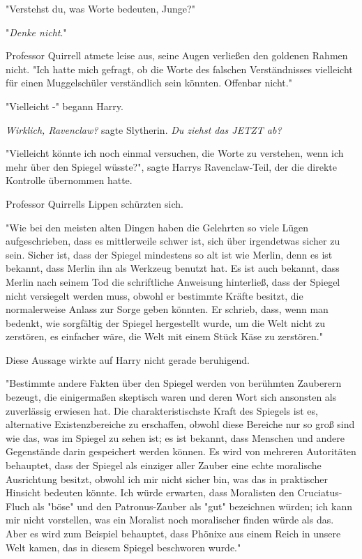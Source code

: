 {"Verstehst du, was Worte bedeuten, Junge?"

"\emph{Denke nicht}."

Professor Quirrell atmete leise aus, seine Augen verließen den goldenen Rahmen nicht. "Ich hatte mich gefragt, ob die Worte des falschen Verständnisses vielleicht für einen Muggelschüler verständlich sein könnten. Offenbar nicht."

"Vielleicht -" begann Harry.

\emph{Wirklich, Ravenclaw?} sagte Slytherin. \emph{Du ziehst das JETZT ab?}

"Vielleicht könnte ich noch einmal versuchen, die Worte zu verstehen, wenn ich mehr über den Spiegel wüsste?", sagte Harrys Ravenclaw-Teil, der die direkte Kontrolle übernommen hatte.

Professor Quirrells Lippen schürzten sich.

"Wie bei den meisten alten Dingen haben die Gelehrten so viele Lügen aufgeschrieben, dass es mittlerweile schwer ist, sich über irgendetwas sicher zu sein. Sicher ist, dass der Spiegel mindestens so alt ist wie Merlin, denn es ist bekannt, dass Merlin ihn als Werkzeug benutzt hat. Es ist auch bekannt, dass Merlin nach seinem Tod die schriftliche Anweisung hinterließ, dass der Spiegel nicht versiegelt werden muss, obwohl er bestimmte Kräfte besitzt, die normalerweise Anlass zur Sorge geben könnten. Er schrieb, dass, wenn man bedenkt, wie sorgfältig der Spiegel hergestellt wurde, um die Welt nicht zu zerstören, es einfacher wäre, die Welt mit einem Stück Käse zu zerstören."

Diese Aussage wirkte auf Harry nicht gerade beruhigend.

"Bestimmte andere Fakten über den Spiegel werden von berühmten Zauberern bezeugt, die einigermaßen skeptisch waren und deren Wort sich ansonsten als zuverlässig erwiesen hat. Die charakteristischste Kraft des Spiegels ist es, alternative Existenzbereiche zu erschaffen, obwohl diese Bereiche nur so groß sind wie das, was im Spiegel zu sehen ist; es ist bekannt, dass Menschen und andere Gegenstände darin gespeichert werden können. Es wird von mehreren Autoritäten behauptet, dass der Spiegel als einziger aller Zauber eine echte moralische Ausrichtung besitzt, obwohl ich mir nicht sicher bin, was das in praktischer Hinsicht bedeuten könnte. Ich würde erwarten, dass Moralisten den Cruciatus-Fluch als "böse" und den Patronus-Zauber als "gut" bezeichnen würden; ich kann mir nicht vorstellen, was ein Moralist noch moralischer finden würde als das. Aber es wird zum Beispiel behauptet, dass Phönixe aus einem Reich in unsere Welt kamen, das in diesem Spiegel beschworen wurde."

}
